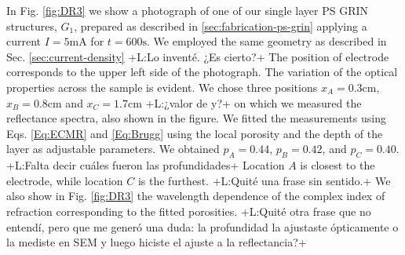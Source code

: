 \documentclass{article}
\newcommand{\notaL}[1]{{\color{blue}+L:#1+}}
\begin{document}
 In Fig. \ref{fig:DR3} we show a photograph of one of our single layer PS GRIN
 structures, $G_1$, prepared as described in
 \ref{sec:fabrication-ps-grin} applying a current $I=5\text{mA}$ for
 $t=600\text{s}$. We employed the same geometry as described in
 Sec. \ref{sec:current-density} \notaL{Lo inventé. ¿Es cierto?}
The position of electrode corresponds to the upper left side of the
photograph. The variation of the optical properties across the
sample is evident. We chose three positions $x_A=0.3\text{cm}$,
$x_B=0.8\text{cm}$ and $x_C=1.7\text{cm}$ \notaL{¿valor de y?} on
which we measured the reflectance spectra, also shown in the figure.
We fitted the measurements using Eqs. \eqref{Eq:ECMR} and
\eqref{Eq:Brugg} using the local porosity and the depth of the layer
as adjustable parameters. We obtained $p_A=0.44$, $p_B=0.42$, and
$p_C= 0.40$. \notaL{Falta decir cuáles fueron las profundidades}
Location $A$ is
closest to the electrode, while location $ C $ is the furthest.
\notaL{Quité una frase sin sentido.}
We also show in Fig. \ref{fig:DR3} the wavelength dependence of
 the complex index of refraction corresponding to the fitted porosities.
\notaL{Quité otra frase que no entendí, pero que me generó una duda:
  la profundidad la ajustaste ópticamente o la mediste en SEM y luego
  hiciste el ajuste a la reflectancia?}
\end{document}
